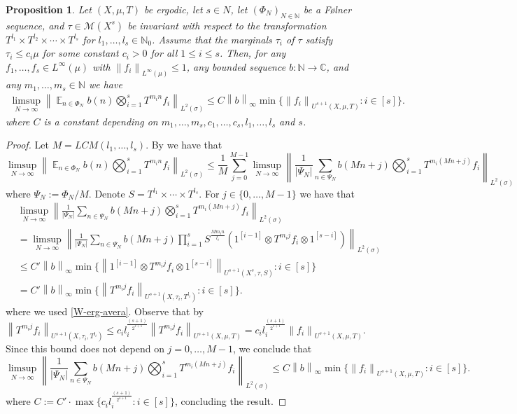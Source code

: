 \documentclass[letter,11pt]{article}
\newtheorem{prop}[theo]{Proposition}
\theoremstyle{definition}
\newcommand{\N}{\mathbb{N}}
\newcommand{\C}{\mathbb{C}}
\newcommand{\bE}{\mathop{\mathbb{E}}}
\newcommand{\norm}[1]{\left\lVert#1\right\rVert}
\begin{document}
\begin{prop}\label{general-version}
    Let $(X,\mu,T)$ be ergodic, let $s\in N$, let $(\Phi_N)_{N\in \N}$ be a F\o lner sequence, and $\tau\in \mathcal{M}(X^{s})$ be invariant with respect to the transformation $T^{l_1}\times T^{l_2}\times \cdots \times T^{l_{s}}$ for $l_1,\ldots,l_s\in \N_0$. Assume that the marginals $\tau_i$ of $\tau$ satisfy $\tau_i\leq c_i \mu$ for some constant $c_i>0$ for all $1\leq i \leq s$. Then, for any $f_1,\ldots,f_{s}\in L^\infty(\mu)$ with $\norm{f_i}_{L^\infty(\mu)}\leq 1$, any bounded sequence $b:\N\to \C$, and any $m_1,\ldots,m_s\in \N$ we have
    \begin{align*}
            \limsup_{N\to\infty} \norm{\bE_{n\in \Phi_N} b(n) \bigotimes_{i=1}^s T^{m_in}   f_{i} 
   }_{L^2(\sigma)}\leq C \norm{b}_\infty \min\{ \norm{f_i}_{U^{s+1}(X,\mu,T)} :  i\in [s]\} .
    \end{align*}
    where $C$ is a constant depending on $m_1,\ldots,m_s,c_1,\ldots,c_s,l_1,\ldots,l_s$ and $s$.
\end{prop}
\begin{proof}
Let $M=LCM(l_1,\ldots,l_s)$. By \cite[Lemma 6.8]{kmrr25} we have that 
$$ \limsup_{N\to\infty} \norm{\bE_{n\in \Phi_N} b(n) \bigotimes_{i=1}^s T^{m_in}   f_{i} 
   }_{L^2(\sigma)} \leq \frac{1}{M} \sum_{j=0}^{M-1}\limsup_{N\to\infty} \norm{ \frac{1}{|\Psi_N|}  \sum_{n\in \Psi_N}  b(Mn+j) \bigotimes_{i=1}^s T^{m_i(Mn+j)}   f_{i}}_{L^2(\sigma)} $$
where $\Psi_N:=\Phi_N/M$. Denote $S=T^{l_1}\times \cdots \times T^{l_{s}}$. For $j\in \{0,\ldots,M-1\}$ we have that 
\begin{align*}
  & \limsup_{N\to\infty} \norm{ \frac{1}{|\Psi_N|}  \sum_{n\in \Psi_N}  b(Mn+j) \bigotimes_{i=1}^s T^{m_i(Mn+j)}   f_{i}}_{L^2(\sigma)} \\
   &=  \limsup_{N\to\infty} \norm{ \frac{1}{|\Psi_N|}  \sum_{n\in \Psi_N}  b(Mn+j) \prod_{i=1}^s S^{\frac{Mm_in}{l_i}}( 1^{[i-1]}\otimes   T^{m_ij}f_{i} \otimes 1^{[s-i]} )}_{L^2(\sigma)}\\
   &\leq C' \norm{b}_\infty \min\{   \norm{  1^{[i-1]}\otimes   T^{m_ij}f_{i} \otimes 1^{[s-i]} }_{U^{s+1}(X^s,\tau,S)} : i\in [s] \}\\
   &=  C' \norm{b}_\infty \min\{   \norm{  T^{m_ij}f_{i}}_{U^{s+1}(X,\tau_i,T^{l_i})} : i\in[s]\}.  
\end{align*}
where we used \cref{W-erg-avera}. Observe that by \cite[Lemma 6.7, part (ii)]{kmrr25}
$$ \norm{  T^{m_ij}f_{i}}_{U^{s+1}(X,\tau_i,T^{l_i})}\leq c_i l_i^{\frac{(s+1)}{2^{s+1}}}\norm{  T^{m_ij}f_{i}}_{U^{s+1}(X,\mu,T)} =c_i l_i^{\frac{(s+1)}{2^{s+1}}}\norm{ f_{i}}_{U^{s+1}(X,\mu,T)}.  $$
Since this bound does not depend on $j=0,\ldots,M-1$, we conclude that 
$$\limsup_{N\to\infty} \norm{ \frac{1}{|\Psi_N|}  \sum_{n\in \Psi_N}  b(Mn+j) \bigotimes_{i=1}^s T^{m_i(Mn+j)}   f_{i}}_{L^2(\sigma)}\leq C \norm{b}_\infty \min\{  \norm{ f_{i}}_{U^{s+1}(X,\mu,T)} : i\in[s]\}. $$
where $C:= C'\cdot \max\{ c_i l_i^{\frac{(s+1)}{2^{s+1}}}:i\in [s]\}$, concluding the result. 
\end{proof}
\end{document}
